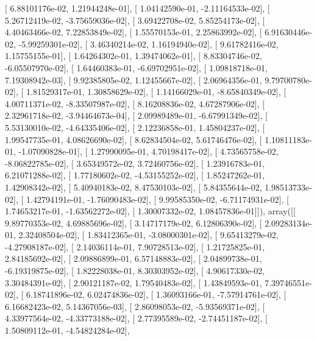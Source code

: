 \documentclass{article}
\begin{document}
       [  6.88101176e-02,   1.21944248e-01],
       [  1.04142590e-01,  -2.11164533e-02],
       [  5.26712419e-02,  -3.75659036e-02],
       [  3.69422708e-02,   5.85254173e-02],
       [  4.40463466e-02,   7.22853849e-02],
       [  1.55570153e-01,   2.25863992e-02],
       [  6.91630446e-02,  -5.99259301e-02],
       [  3.46340214e-02,   1.16194940e-02],
       [  9.61782416e-02,   1.15755155e-01],
       [  1.64264302e-01,   1.39474062e-01],
       [  8.83304746e-02,  -6.05507970e-02],
       [  1.64460383e-01,  -6.69702951e-02],
       [  1.09818718e-01,   7.19308942e-03],
       [  9.92385805e-02,   1.12455667e-02],
       [  2.06964356e-01,   9.79700780e-02],
       [  1.81529317e-01,   1.30858629e-02],
       [  1.14166029e-01,  -8.65840349e-02],
       [  4.00711371e-02,  -8.33507987e-02],
       [  8.16208836e-02,   4.67287906e-02],
       [  2.32961718e-02,  -3.94464673e-04],
       [  2.09989489e-01,  -6.67991349e-02],
       [  5.53130010e-02,  -4.64335406e-02],
       [  2.12236858e-01,   1.45804237e-02],
       [  1.99547735e-01,   4.08626690e-02],
       [  8.62834504e-02,   5.61746476e-02],
       [  1.10811183e-01,  -1.07090828e-01],
       [  1.27990095e-01,   4.70198417e-02],
       [  4.73565758e-02,  -8.06822785e-02],
       [  3.65349572e-02,   3.72460756e-02],
       [  1.23916783e-01,   6.21071288e-02],
       [  1.77180602e-02,  -4.53155252e-02],
       [  1.85247262e-01,   1.42908342e-02],
       [  5.40940183e-02,   8.47530103e-02],
       [  5.84355644e-02,   1.98513733e-02],
       [  1.42794191e-01,  -1.76090483e-02],
       [  9.99585350e-02,  -6.71174931e-02],
       [  1.74653217e-01,  -1.63562272e-02],
       [  1.30007332e-02,   1.08457836e-01]]), array([[  9.89770353e-02,   4.69885696e-02],
       [  3.14717179e-02,   6.12806390e-02],
       [  2.09283134e-01,   2.32408504e-02],
       [  1.83412365e-01,  -3.08000301e-02],
       [  9.65413279e-02,  -4.27908187e-02],
       [  2.14036114e-01,   7.90728513e-02],
       [  1.21725825e-01,   2.84185692e-02],
       [  2.09886899e-01,   6.57148883e-02],
       [  2.04899738e-01,  -6.19319875e-02],
       [  1.82228038e-01,   8.30303952e-02],
       [  4.90617330e-02,   3.30484391e-02],
       [  2.90121187e-02,   1.79540483e-02],
       [  1.43849593e-01,   7.39746551e-02],
       [  6.18741896e-02,   6.02474836e-02],
       [  1.36093166e-01,  -7.57914761e-02],
       [  6.16682423e-02,   5.14367056e-03],
       [  2.86098053e-02,  -5.93569371e-02],
       [  4.33977564e-02,  -4.33773188e-02],
       [  2.77395589e-02,  -2.74451187e-02],
       [  1.50809112e-01,  -4.54824284e-02],
\end{document}
